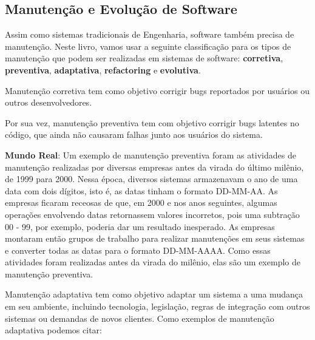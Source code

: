\documentclass[
  11pt,
  twoside]{book}
\newenvironment{esmbox}{\centering \vspace{1.5ex} \begin{tcolorbox}[breakable, colback=backcolor, width=4.9in]}{\end{tcolorbox} \vspace{1.5ex}}
\begin{document}
\hypertarget{manutenuxe7uxe3o-e-evoluuxe7uxe3o-de-software}{%
\subsection{Manutenção e Evolução de
Software}\label{manutenuxe7uxe3o-e-evoluuxe7uxe3o-de-software}}


Assim como sistemas tradicionais de Engenharia, software também precisa
de manutenção. Neste livro, vamos usar a seguinte classificação para os
tipos de manutenção que podem ser realizadas em sistemas de software:
\textbf{corretiva}, \textbf{preventiva}, \textbf{adaptativa},
\textbf{refactoring} e \textbf{evolutiva}.

 Manutenção corretiva tem como
objetivo corrigir bugs reportados por usuários ou outros
desenvolvedores.

 Por sua vez, manutenção
preventiva tem com objetivo corrigir bugs latentes no código, que ainda
não causaram falhas junto aos usuários do sistema.


\begin{esmbox}

\textbf{Mundo Real}: Um exemplo de manutenção preventiva foram as
atividades de manutenção realizadas por diversas empresas antes da
virada do último milênio, de 1999 para 2000. Nessa época, diversos
sistemas armazenavam o ano de uma data com dois dígitos, isto é, as
datas tinham o formato DD-MM-AA. As empresas ficaram receosas de que, em
2000 e nos anos seguintes, algumas operações envolvendo datas
retornassem valores incorretos, pois uma subtração 00 - 99, por exemplo,
poderia dar um resultado inesperado. As empresas montaram então grupos
de trabalho para realizar manutenções em seus sistemas e converter todas
as datas para o formato DD-MM-AAAA. Como essas atividades foram
realizadas antes da virada do milênio, elas são um exemplo de manutenção
preventiva.

\end{esmbox}

 Manutenção adaptativa tem como
objetivo adaptar um sistema a uma mudança em seu ambiente, incluindo
tecnologia, legislação, regras de integração com outros sistemas ou
demandas de novos clientes. Como exemplos de manutenção adaptativa
podemos citar:
\end{document}
